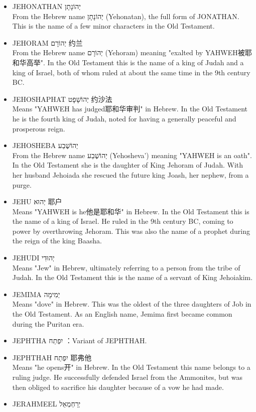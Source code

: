 \begin{itemize}
\item JEHONATHAN יְהוֹנָתָן \\
From the Hebrew name יְהוֹנָתָן (Yehonatan), the full form of JONATHAN. This is the name of a few minor characters in the Old Testament.
\item JEHORAM יְהוֹרָם 约兰\\
From the Hebrew name יְהוֹרָם (Yehoram) meaning "exalted by YAHWEH被耶和华高举". In the Old Testament this is the name of a king of Judah and a king of Israel, both of whom ruled at about the same time in the 9th century BC.
\item JEHOSHAPHAT יְהוֹשָׁפָט 约沙法\\
Means "YAHWEH has judged耶和华审判" in Hebrew. In the Old Testament he is the fourth king of Judah, noted for having a generally peaceful and prosperous reign.
\item JEHOSHEBA יְהוֹשֶׁבַע\\
From the Hebrew name יְהוֹשֶׁבַע (Yehosheva') meaning "YAHWEH is an oath". In the Old Testament she is the daughter of King Jehoram of Judah. With her husband Jehoiada she rescued the future king Joash, her nephew, from a purge.
\item JEHU יְהוּא 耶户\\
Means "YAHWEH is he他是耶和华" in Hebrew. In the Old Testament this is the name of a king of Israel. He ruled in the 9th century BC, coming to power by overthrowing Jehoram. This was also the name of a prophet during the reign of the king Baasha.
\item JEHUDI יְהוּדִי \\
Means "Jew" in Hebrew, ultimately referring to a person from the tribe of Judah. In the Old Testament this is the name of a servant of King Jehoiakim.
\item JEMIMA יְמִימָה \\
Means "dove" in Hebrew. This was the oldest of the three daughters of Job in the Old Testament. As an English name, Jemima first became common during the Puritan era.
\item JEPHTHA יִפְתַח ：Variant of JEPHTHAH.
\item JEPHTHAH יִפְתַח 耶弗他\\
Means "he opens开" in Hebrew. In the Old Testament this name belongs to a ruling judge. He successfully defended Israel from the Ammonites, but was then obliged to sacrifice his daughter because of a vow he had made.
\item JERAHMEEL יְרַחְמְאֵל \\

\end{itemize}
